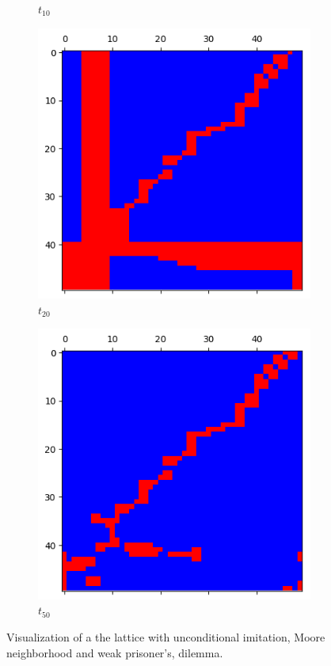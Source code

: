 \documentclass[letterpaper]{article}
\begin{document}
\begin{figure}[H]
\begin{subfigure}{.33\textwidth}
      \caption{$t_{10}$}
      \label{fig:t10_50part1}
    \end{subfigure}
    \begin{subfigure}{.33\textwidth}
      \centering
      \includegraphics[width=1\linewidth]{images/assign2/visu_50-part1/t20}
      \caption{$t_{20}$}
      \label{fig:t20_50part1}
    \end{subfigure}
    \begin{subfigure}{.33\textwidth}
      \centering
      \includegraphics[width=1\linewidth]{images/assign2/visu_50-part1/t50}
      \caption{$t_{50}$}
      \label{fig:t50_50part1}
    \end{subfigure}
    \caption{Visualization of a the lattice with unconditional imitation,
    Moore neighborhood and weak prisoner's, dilemma.}
    \label{fig:visu50part1}
\end{figure}
\end{document}
